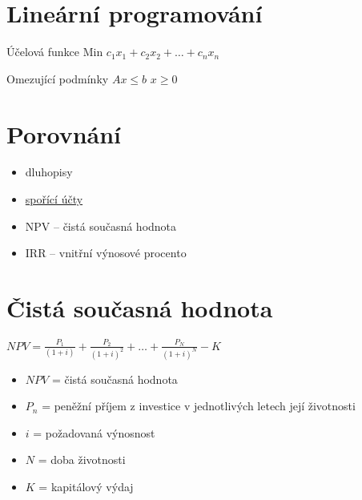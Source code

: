 \documentclass[12pt, aspectratio=169]{beamer} %
\begin{document}
\section{Lineární programování}

    \begin{frame}{\insertsection}
    \begin{block}{Účelová funkce}
        \vspace{10pt}
        \centering
        Min $c_1x_1 + c_2x_2 + \ldots + c_nx_n$
    \end{block}

    \begin{block}{Omezující podmínky}
        \vspace{10pt}
        \centering
        $Ax \leq b$
        \break
        $x \geq 0$
    \end{block}

    \end{frame}

\section{Porovnání}

\begin{frame}{\insertsection}
    \begin{itemize}
        \item dluhopisy
        \item \href{https://www.mesec.cz/produkty/sporici-ucty/}{spořící účty}
        \item NPV – čistá současná hodnota
        \item IRR – vnitřní výnosové procento
    \end{itemize}

\end{frame}
\section{Čistá současná hodnota}

\begin{frame}{\insertsection}

    \begin{center}
        $NPV = \frac{P_1}{(1+i)} + \frac{P_2}{(1+i)^2} + \ldots + \frac{P_N}{(1+i)^N} - K$
    \end{center}
    
    \vspace{10pt} %
    \begin{itemize}
        \item $NPV$ = čistá současná hodnota
        \item $P_n$ = peněžní příjem z investice v jednotlivých letech její životnosti
        \item $i$ = požadovaná výnosnost
        \item $N$ = doba životnosti
        \item $K$ = kapitálový výdaj
    \end{itemize}

\end{frame}
\end{document}
